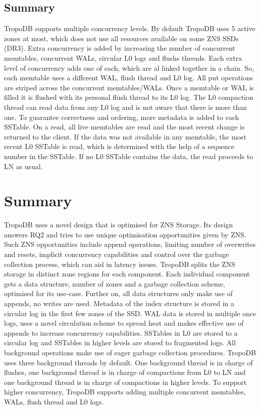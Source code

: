 \subsection{Summary}
TropoDB supports multiple concurrency levels. By default TropoDB uses 5 active zones at most, which does not use all resources available on some ZNS SSDs (DR3). Extra concurrency is added by increasing the number of concurrent memtables, concurrent WALs, circular L0 logs and flushs threads. Each extra level of concurrency adds one of each, which are al linked together in a chain.  So, each memtable uses a different WAL, flush thread and L0 log. All put operations are striped across the concurrent memtables/WALs. Once a memtable or WAL is filled it is flushed with its personal flush thread to its L0 log. The L0 compaction thread can read data from any L0 log and is not aware that there is more than one. To guarantee correctness and ordering, more metadata is added to each SSTable. On a read, all live memtables are read and the most recent change is returned to the client. If the data was not available in any memtable, the most recent L0 SSTable is read, which is determined with the help of a sequence number in the SSTable. If no L0 SSTable contains the data, the read proceeds to LN as usual.

\section{Summary}
TropoDB uses a novel design that is optimised for ZNS Storage. Its design answers RQ2 and tries to use unique optimisation opportunities given by ZNS. Such ZNS opportunities include append operations, limiting number of overwrites and resets, implicit concurrency capabilities and control over the garbage collection process, which can aid in latency issues. TropoDB splits the ZNS storage in distinct zone regions for each component. Each individual component gets a data structure, number of zones and a garbage collection scheme, optimised for its use-case. Further on, all data structures only make use of appends, no writes are used. Metadata of the index structure is stored in a circular log in the first few zones of the SSD. WAL data is stored in multiple once logs, uses a novel circulation scheme to spread heat and makes effective use of appends to increase concurrency capabilities. SSTables in L0 are stored to a circular log and SSTables in higher levels are stored to fragmented logs. All background operations make use of eager garbage collection procedures. TropoDB uses three background threads by default. One background thread is in charge of flushes, one background thread is in charge of compactions from L0 to LN and one background thread is in charge of compactions in higher levels. To support higher concurrency, TropoDB supports adding multiple concurrent memtables, WALs, flush thread and L0 logs.
